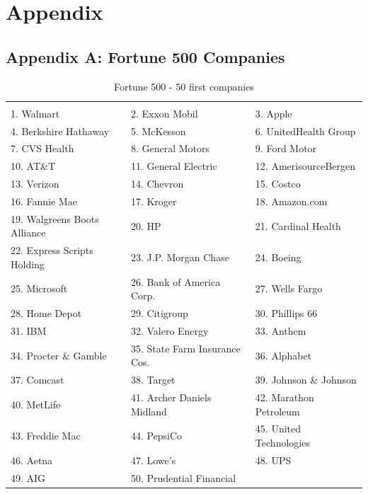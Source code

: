 \documentclass{book}
\begin{document}
\chapter{Appendix}
\section{Appendix A: Fortune 500 Companies} \label{appA}
\begin{table}[H]
\centering
\caption{Fortune 500 - 50 first companies}
\begin{tabular}{lll}
\hline
 \\ 1. Walmart 
&  2. Exxon Mobil 
&  3. Apple 
\\ 4. Berkshire Hathaway 
&  5. McKesson 
&  6. UnitedHealth Group 
\\ 7. CVS Health 
&  8. General Motors 
&  9. Ford Motor 
\\ 10. AT\&T 
&  11. General Electric 
&  12. AmerisourceBergen 
\\ 13. Verizon 
&  14. Chevron 
&  15. Costco 
\\ 16. Fannie Mae 
&  17. Kroger 
&  18. Amazon.com 
\\ 19. Walgreens Boots Alliance 
&  20. HP 
&  21. Cardinal Health 
\\ 22. Express Scripts Holding 
&  23. J.P. Morgan Chase 
&  24. Boeing 
\\ 25. Microsoft 
&  26. Bank of America Corp. 
&  27. Wells Fargo 
\\ 28. Home Depot 
&  29. Citigroup 
&  30. Phillips 66 
\\ 31. IBM 
&  32. Valero Energy 
&  33. Anthem 
\\ 34. Procter \& Gamble 
&  35. State Farm Insurance Cos. 
&  36. Alphabet 
\\ 37. Comcast 
&  38. Target 
&  39. Johnson \& Johnson 
\\ 40. MetLife 
&  41. Archer Daniels Midland 
&  42. Marathon Petroleum 
\\ 43. Freddie Mac 
&  44. PepsiCo 
&  45. United Technologies 
\\ 46. Aetna 
&  47. Lowe's 
&  48. UPS 
\\ 49. AIG 
&  50. Prudential Financial 
&
 \\ \hline
 \end{tabular}
\end{table}
\end{document}
